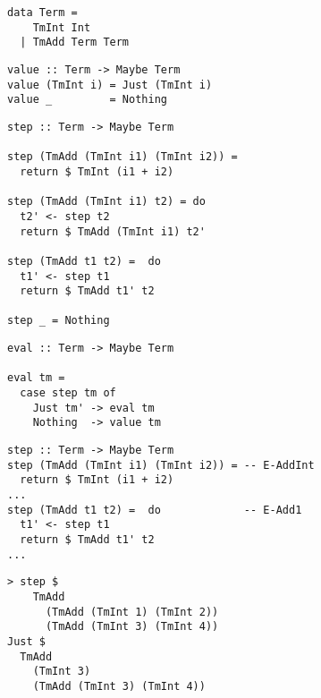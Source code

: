 
\begin{frame}[fragile]
  \begin{verbatim}
data Term =
    TmInt Int
  | TmAdd Term Term
  \end{verbatim}
\end{frame}

\begin{frame}[fragile]
  \begin{verbatim}
value :: Term -> Maybe Term
value (TmInt i) = Just (TmInt i)
value _         = Nothing
  \end{verbatim}
\end{frame}

\begin{frame}[fragile]
  \begin{verbatim}
step :: Term -> Maybe Term

step (TmAdd (TmInt i1) (TmInt i2)) = 
  return $ TmInt (i1 + i2)

step (TmAdd (TmInt i1) t2) = do
  t2' <- step t2
  return $ TmAdd (TmInt i1) t2'

step (TmAdd t1 t2) =  do
  t1' <- step t1
  return $ TmAdd t1' t2

step _ = Nothing
  \end{verbatim}
\end{frame}

\begin{frame}[fragile]
  \begin{verbatim}
eval :: Term -> Maybe Term

eval tm = 
  case step tm of
    Just tm' -> eval tm
    Nothing  -> value tm
  \end{verbatim}
\end{frame}

\begin{frame}[fragile]
  \begin{mdframed}[frametitle={Previously...}]
\begin{verbatim}
step :: Term -> Maybe Term
step (TmAdd (TmInt i1) (TmInt i2)) = -- E-AddInt
  return $ TmInt (i1 + i2)
...
step (TmAdd t1 t2) =  do             -- E-Add1
  t1' <- step t1
  return $ TmAdd t1' t2
...
\end{verbatim}
  \end{mdframed}
  \vfill
\begin{verbatim}
> step $
    TmAdd 
      (TmAdd (TmInt 1) (TmInt 2)) 
      (TmAdd (TmInt 3) (TmInt 4))
Just $ 
  TmAdd 
    (TmInt 3) 
    (TmAdd (TmInt 3) (TmInt 4))
\end{verbatim}
\end{frame}
